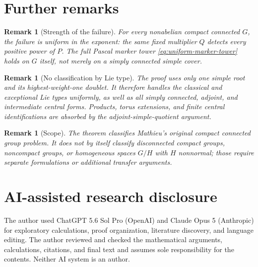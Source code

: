 \documentclass[11pt]{article}
\numberwithin{equation}{section}
\newtheorem{remark}[theorem]{Remark}
\begin{document}
\section{Further remarks}

\begin{remark}[Strength of the failure]
For every nonabelian compact connected $G$, the failure is uniform in the
exponent: the same fixed multiplier $Q$ detects every positive power of $P$.
The full Pascal marker tower \eqref{eq:uniform-marker-tower} holds on $G$
itself, not merely on a simply connected simple cover.
\end{remark}

\begin{remark}[No classification by Lie type]
The proof uses only one simple root and its highest-weight-one doublet.  It
therefore handles the classical and exceptional Lie types uniformly, as well
as all simply connected, adjoint, and intermediate central forms.  Products,
torus extensions, and finite central identifications are absorbed by the
adjoint-simple-quotient argument.
\end{remark}

\begin{remark}[Scope]
The theorem classifies Mathieu's original compact connected group problem.
It does not by itself classify disconnected compact groups, noncompact groups,
or homogeneous spaces $G/H$ with $H$ nonnormal; those require separate
formulations or additional transfer arguments.
\end{remark}

\section*{AI-assisted research disclosure}

The author used ChatGPT 5.6 Sol Pro (OpenAI) and Claude Opus 5 (Anthropic) for
exploratory calculations, proof organization, literature discovery, and
language editing.  The author reviewed and checked the mathematical
arguments, calculations, citations, and final text and assumes sole
responsibility for the contents.  Neither AI system is an author.
\end{document}
